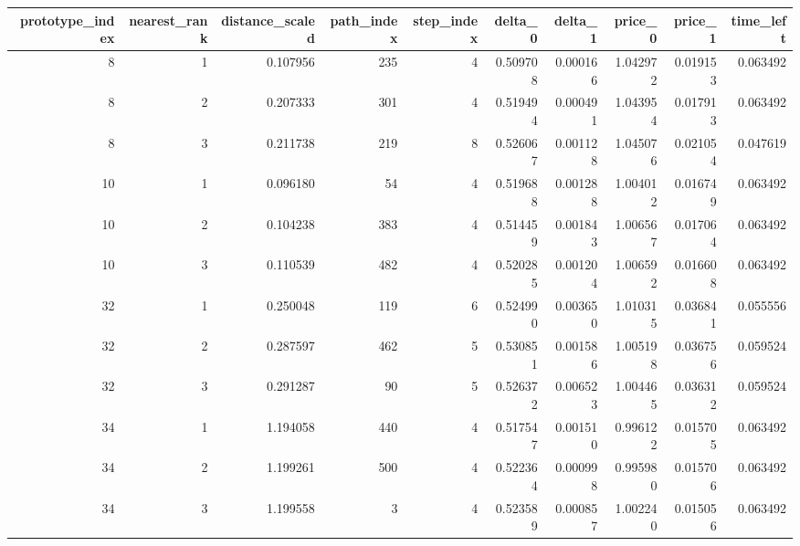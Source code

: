 \begin{tabular}{rrrrrrrrrr}
\toprule
prototype_index & nearest_rank & distance_scaled & path_index & step_index & delta_0 & delta_1 & price_0 & price_1 & time_left \\
\midrule
8 & 1 & 0.107956 & 235 & 4 & 0.509708 & 0.000166 & 1.042972 & 0.019153 & 0.063492 \\
8 & 2 & 0.207333 & 301 & 4 & 0.519494 & 0.000491 & 1.043954 & 0.017913 & 0.063492 \\
8 & 3 & 0.211738 & 219 & 8 & 0.526067 & 0.001128 & 1.045076 & 0.021054 & 0.047619 \\
10 & 1 & 0.096180 & 54 & 4 & 0.519688 & 0.001288 & 1.004012 & 0.016749 & 0.063492 \\
10 & 2 & 0.104238 & 383 & 4 & 0.514459 & 0.001843 & 1.006567 & 0.017064 & 0.063492 \\
10 & 3 & 0.110539 & 482 & 4 & 0.520285 & 0.001204 & 1.006592 & 0.016608 & 0.063492 \\
32 & 1 & 0.250048 & 119 & 6 & 0.524990 & 0.003650 & 1.010315 & 0.036841 & 0.055556 \\
32 & 2 & 0.287597 & 462 & 5 & 0.530851 & 0.001586 & 1.005198 & 0.036756 & 0.059524 \\
32 & 3 & 0.291287 & 90 & 5 & 0.526372 & 0.006523 & 1.004465 & 0.036312 & 0.059524 \\
34 & 1 & 1.194058 & 440 & 4 & 0.517547 & 0.001510 & 0.996122 & 0.015705 & 0.063492 \\
34 & 2 & 1.199261 & 500 & 4 & 0.522364 & 0.000998 & 0.995980 & 0.015706 & 0.063492 \\
34 & 3 & 1.199558 & 3 & 4 & 0.523589 & 0.000857 & 1.002240 & 0.015056 & 0.063492 \\
\bottomrule
\end{tabular}
